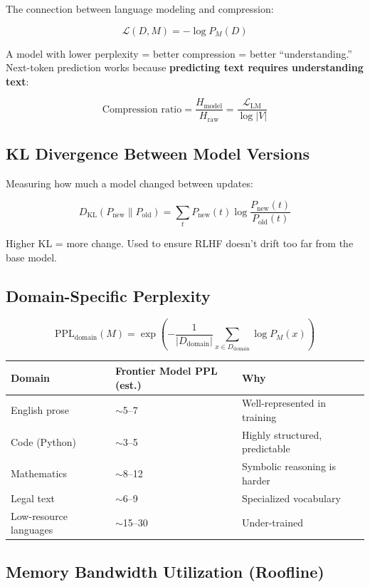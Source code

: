 \documentclass[11pt,a4paper]{article}
\begin{document}
The connection between language modeling and compression:

$$\mathcal{L}(D, M) = -\log P_M(D)$$

A model with lower perplexity = better compression = better ``understanding.'' Next-token prediction works because \textbf{predicting text requires understanding text}:

$$\text{Compression ratio} = \frac{H_{\text{model}}}{H_{\text{raw}}} = \frac{\mathcal{L}_{\text{LM}}}{\log |V|}$$

\subsection{KL Divergence Between Model Versions}

Measuring how much a model changed between updates:

$$D_{\text{KL}}(P_{\text{new}} \| P_{\text{old}}) = \sum_{t} P_{\text{new}}(t) \log \frac{P_{\text{new}}(t)}{P_{\text{old}}(t)}$$

Higher KL = more change. Used to ensure RLHF doesn't drift too far from the base model.

\subsection{Domain-Specific Perplexity}

$$\text{PPL}_{\text{domain}}(M) = \exp\!\left(-\frac{1}{|D_{\text{domain}}|}\sum_{x \in D_{\text{domain}}} \log P_M(x)\right)$$

\begin{center}
\begin{tabular}{lll}
\toprule
\textbf{Domain} & \textbf{Frontier Model PPL (est.)} & \textbf{Why} \\
\midrule
English prose & $\sim$5--7 & Well-represented in training \\
Code (Python) & $\sim$3--5 & Highly structured, predictable \\
Mathematics & $\sim$8--12 & Symbolic reasoning is harder \\
Legal text & $\sim$6--9 & Specialized vocabulary \\
Low-resource languages & $\sim$15--30 & Under-trained \\
\bottomrule
\end{tabular}
\end{center}

\subsection{Memory Bandwidth Utilization (Roofline)}
\end{document}

